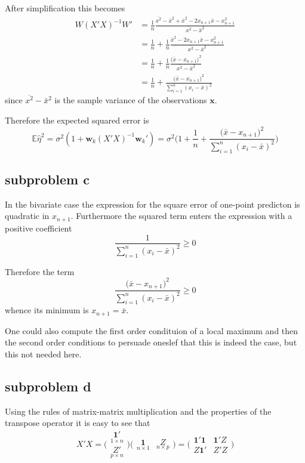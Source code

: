 \documentclass[a4paper]{article}
\newcommand{\w}{\mathbf{w}}
\newcommand{\e}{\mathbf{1}}
\newcommand{\Ex}{\mathbb{E}}
\begin{document}
After simplification this becomes
\begin{align*}
	W (X'X)^{-1} W'
	&= \frac{1}{n} \frac{ \overline{x^2} - \bar{x}^2 + \bar{x}^2 - 2 x_{n+1}\bar{x} - x_{n+1}^2 }{ \overline{x^2} - \bar{x}^2 } \\
	&= \frac{1}{n} + \frac{1}{n}\frac{ \bar{x}^2 - 2 x_{n+1}\bar{x} - x_{n+1}^2 }{ \overline{x^2} - \bar{x}^2} \\
	&= \frac{1}{n} + \frac{1}{n}\frac{ \big(\bar{x} - x_{n+1}\big)^2 }{ \overline{x^2} - \bar{x}^2 } \\
	&= \frac{1}{n} + \frac{ \big(\bar{x} - x_{n+1}\big)^2 }{ \sum_{i=1}^n (x_i - \bar{x})^2 }
\end{align*}
since $\overline{x^2} - \bar{x}^2$ is the sample variance of the observations
$\mathbf{x}$.

Therefore the expected squared error is 
\[
	\Ex \hat{\eta}^2
	= \sigma^2( 1 + \w_k (X'X)^{-1} \w_k' )
	= \sigma^2 \Big( 1 + \frac{1}{n} + \frac{ \big(\bar{x} - x_{n+1}\big)^2 }{ \sum_{i=1}^n (x_i - \bar{x})^2 } \Big)
\]


\subsection{subproblem c} %
\label{sub:subproblem_c}

In the bivariate case the expression for the square error of one-point
predicton is quadratic in $x_{n+1}$. Furthermore the squared term enters the
expression with a positive coefficient \[\frac{1}{\sum_{i=1}^n (x_i - \bar{x})^2}\geq 0\]

Therefore the term
\[\frac{ \big(\bar{x} - x_{n+1}\big)^2 }{ \sum_{i=1}^n (x_i - \bar{x})^2 } \geq 0 \]
whence its minimum is $x_{n+1} = \bar{x}$.

One could also compute the first order condituion of a local maximum and then
the second order conditions to persuade oneslef that this is indeed the case,
but this not needed here.


\subsection{subproblem d} %
\label{sub:subproblem_d}

Using the rules of matrix-matrix multiplication and the properties of the
transpose operator it is easy to see that
\[
X'X 
= \Bigg(\begin{matrix} \underset{1\times n}{\e'} \\ \underset{p\times n}{Z'} \end{matrix}\Bigg) \Big(\begin{matrix} \underset{n\times 1}{\e} & \underset{n\times p}{Z} \end{matrix}\Big)
= \bigg(\begin{matrix} \e'\e & \e'Z \\ Z\e' & Z'Z \end{matrix}\bigg) 
\]
\end{document}
